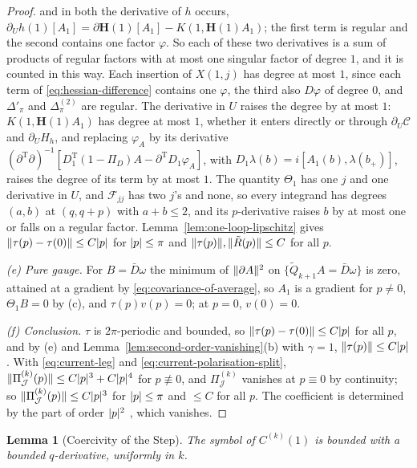 \documentclass[11pt]{preprint}
\DeclarePairedDelimiter{\abs}{\lvert}{\rvert}
\DeclarePairedDelimiter{\norm}{\lVert}{\rVert}
\numberwithin{equation}{section}
\newtheorem{lemma}{Lemma}[section]
\theoremstyle{definition}
\theoremstyle{remark}
\theoremstyle{plain}
\begin{document}
\begin{proof}
and in both the derivative of $h$ occurs, $\partial_Uh(1)[A_1] = \partial\mathbf H(1)[A_1] - K(1, \mathbf H(1)A_1)$; the first term is regular and the second contains one factor $\varphi$. So each of these two derivatives is a sum of products of regular factors with at most one singular factor of degree $1$, and it is counted in this way. Each insertion of $X(1, j)$ has degree at most $1$, since each term of \eqref{eq:hessian-difference} contains one $\varphi$, the third also $D\varphi$ of degree $0$, and $\Delta'_\pi$ and $\Delta^{(2)}_\pi$ are regular. The derivative in $U$ raises the degree by at most $1$: $K(1, \mathbf H(1)A_1)$ has degree at most $1$, whether it enters directly or through $\partial_U\mathcal C$ and $\partial_UH_h$, and replacing $\varphi_A$ by its derivative $(\partial^{\mathrm T}\partial)^{-1}[D_1^{\mathrm T}(1 - \Pi_D)A - \partial^{\mathrm T}D_1\varphi_A]$, with $D_1\lambda(b) = i[A_1(b), \lambda(b_+)]$, raises the degree of its term by at most $1$. The quantity $\Theta_1$ has one $j$ and one derivative in $U$, and $\mathcal F_{jj}$ has two $j$'s and none, so every integrand has degrees $(a, b)$ at $(q, q + p)$ with $a + b \leq 2$, and its $p$-derivative raises $b$ by at most one or falls on a regular factor. Lemma~\ref{lem:one-loop-lipschitz} gives $\norm{\tau(p) - \tau(0)} \leq C\abs{p}$ for $\abs{p} \leq \pi$ and $\norm{\tau(p)}, \norm{\tilde R(p)} \leq C$ for all $p$.

\emph{(e) Pure gauge.} For $B = \bar D\omega$ the minimum of $\norm{\partial A}^2$ on $\{ \tilde Q_{k+1}A = \bar D\omega \}$ is zero, attained at a gradient by \eqref{eq:covariance-of-average}, so $A_1$ is a gradient for $p \neq 0$, $\Theta_1B = 0$ by (c), and $\tau(p)v(p) = 0$; at $p = 0$, $v(0) = 0$.

\emph{(f) Conclusion.} $\tau$ is $2\pi$-periodic and bounded, so $\norm{\tau(p) - \tau(0)} \leq C\abs{p}$ for all $p$, and by (e) and Lemma~\ref{lem:second-order-vanishing}(b) with $\gamma = 1$, $\norm{\tau(p)} \leq C\abs{p}$. With \eqref{eq:current-leg} and \eqref{eq:current-polarisation-split}, $\norm{\Pi^{(k)}_{\mathcal J}(p)} \leq C\abs{p}^3 + C\abs{p}^4$ for $p \not\equiv 0$, and $\Pi^{(k)}_{\mathcal J}$ vanishes at $p \equiv 0$ by continuity; so $\norm{\Pi^{(k)}_{\mathcal J}(p)} \leq C\abs{p}^3$ for $\abs{p} \leq \pi$ and $\leq C$ for all $p$. The coefficient is determined by the part of order $\abs{p}^2$ \cite[(1.22)]{BalabanRG1}, which vanishes.
\end{proof}

\begin{lemma}[Coercivity of the Step]\label{lem:coercive-step}
The symbol of $C^{(k)}(1)$ is bounded with a bounded $q$-derivative, uniformly in $k$.
\end{lemma}
\end{document}

